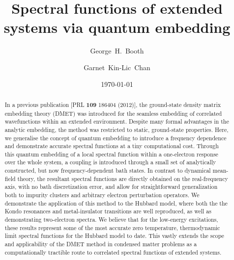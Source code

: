 \documentclass[aps,showpacs,twocolumn,nobibnotes]{revtex4}
\begin{document}
\title{Spectral functions of extended systems via quantum embedding}
\author{George~H.~Booth}
\author{Garnet~Kin-Lic~Chan}  

\begin{abstract}
In a previous publication [PRL {\bf 109} 186404 (2012)], the ground-state density matrix embedding theory (DMET) was introduced for the seamless embedding of
correlated wavefunctions within an extended environment. 
Despite many formal advantages in the analytic embedding, the method was restricted to static, ground-state properties.
Here, we generalise the concept of quantum embedding to introduce a frequency dependence and demonstrate accurate spectral functions at a tiny
computational cost. Through this quantum embedding of a local spectral function within a one-electron response over the whole system, 
a coupling is introduced through a small set of 
analytically constructed, but now frequency-dependent bath states. In contrast to dynamical mean-field theory, the resultant 
spectral functions are directly obtained on the real-frequency axis, with no bath discretization error, and allow for straightforward generalization both 
to impurity clusters and arbitrary electron perturbation operators. We demonstrate
the application of this method to the Hubbard model, where both the the Kondo resonances and metal-insulator transitions are well reproduced, as well as 
demonstrating two-electron spectra. We believe that for the low-energy excitations, these results represent some of the most accurate zero temperature, thermodynamic 
limit spectral functions for the Hubbard model to date. This vastly extends the scope and applicability 
of the DMET method in condensed matter problems as a computationally tractible route to correlated spectral functions of extended systems.
\end{abstract}
\date{\today}
\maketitle
\end{document}
